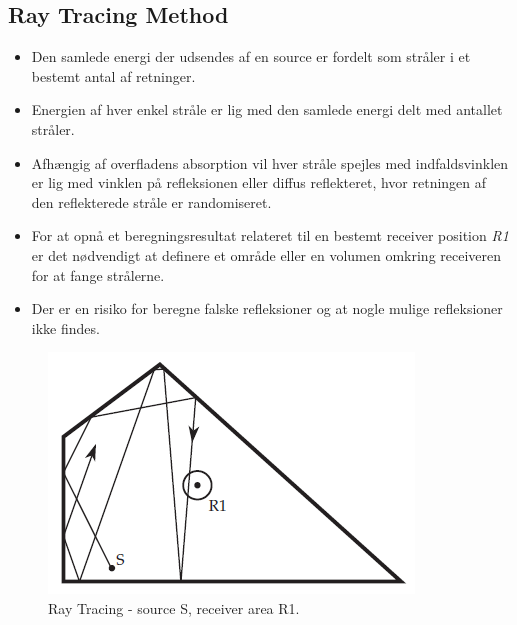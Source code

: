 \subsection{Ray Tracing Method}
\begin{itemize}
	\item Den samlede energi der udsendes af en source er fordelt som stråler i et bestemt antal af retninger.
	\item Energien af hver enkel stråle er lig med den samlede energi delt med antallet stråler. 
	\item Afhængig af overfladens absorption vil hver stråle spejles med indfaldsvinklen er lig med vinklen på refleksionen eller diffus reflekteret, hvor retningen af den reflekterede stråle er randomiseret.
	\item For at opnå et beregningsresultat relateret til en bestemt
	receiver position \textit{R1} er det nødvendigt at definere et område eller en volumen omkring receiveren for at fange strålerne.
	\item Der er en risiko for beregne falske refleksioner og at nogle mulige refleksioner ikke findes.
\end{itemize}

\begin{figure} [H]
	\centering
	\includegraphics[width=.6\linewidth]{graphics/17.png}
	\caption{Ray Tracing - source S, receiver area R1.}
	\label{fig:17}
\end{figure}

